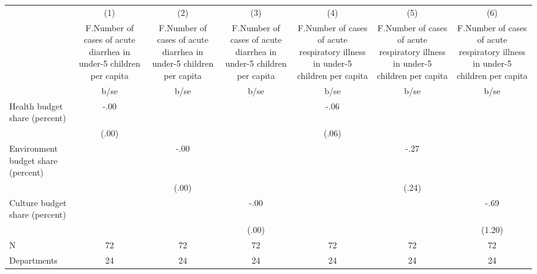 {
\def\sym#1{\ifmmode^{#1}\else\(^{#1}\)\fi}
\begin{tabular}{l*{6}{c}}
\hline\hline
                                                  &\multicolumn{1}{c}{(1)}&\multicolumn{1}{c}{(2)}&\multicolumn{1}{c}{(3)}&\multicolumn{1}{c}{(4)}&\multicolumn{1}{c}{(5)}&\multicolumn{1}{c}{(6)}\\
                                                  &\multicolumn{1}{c}{F.Number of cases of acute diarrhea in under-5 children per capita}&\multicolumn{1}{c}{F.Number of cases of acute diarrhea in under-5 children per capita}&\multicolumn{1}{c}{F.Number of cases of acute diarrhea in under-5 children per capita}&\multicolumn{1}{c}{F.Number of cases of acute respiratory illness in under-5 children per capita}&\multicolumn{1}{c}{F.Number of cases of acute respiratory illness in under-5 children per capita}&\multicolumn{1}{c}{F.Number of cases of acute respiratory illness in under-5 children per capita}\\
                                                  &        b/se   &        b/se   &        b/se   &        b/se   &        b/se   &        b/se   \\
\hline
Health budget share (percent)                     &        -.00   &               &               &        -.06   &               &               \\
                                                  &       (.00)   &               &               &       (.06)   &               &               \\
Environment budget share (percent)                &               &        -.00   &               &               &        -.27   &               \\
                                                  &               &       (.00)   &               &               &       (.24)   &               \\
Culture budget share (percent)                    &               &               &        -.00   &               &               &        -.69   \\
                                                  &               &               &       (.00)   &               &               &      (1.20)   \\
\hline
N                                                 &          72   &          72   &          72   &          72   &          72   &          72   \\
Departments                                       &          24   &          24   &          24   &          24   &          24   &          24   \\
\hline\hline
\end{tabular}
}
